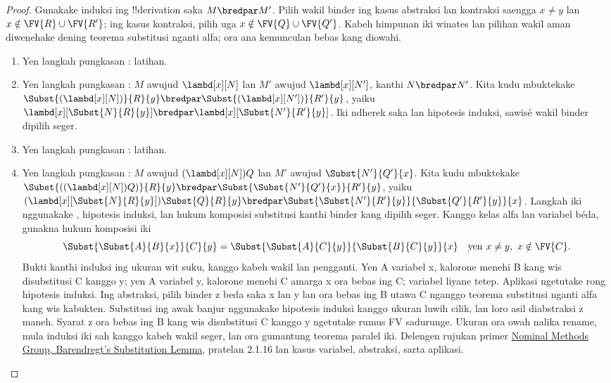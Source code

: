 \documentclass[../../../include/open-logic-section]{subfiles}
\begin{document}
\begin{proof}
  Gunakake induksi ing !!{derivation}
  saka $M \bredpar M'$. Pilih wakil binder ing kasus abstraksi lan kontraksi saengga $x\neq y$ lan $x\notin\FV{R}\cup\FV{R'}$; ing kasus kontraksi, pilih uga $x\notin\FV{Q}\cup\FV{Q'}$. Kabeh himpunan iki winates lan pilihan wakil aman diwenehake dening teorema substitusi nganti alfa; ora ana kemunculan bebas kang diowahi.
  \begin{enumerate}
    \item Yen langkah pungkasan
      : latihan.
    \item Yen langkah pungkasan
      : $M$
      awujud $\lambd[x][N]$ lan
      $M'$ awujud $\lambd[x][N']$,
      kanthi $N \bredpar N'$.
      Kita kudu mbuktekake
      $\Subst{(\lambd[x][N])}{R}{y} \bredpar
      \Subst{(\lambd[x][N'])}{R'}{y}$,
      yaiku
      $\lambd[x][\Subst{N}{R}{y}] \bredpar
      \lambd[x][\Subst{N'}{R'}{y}]$.
      Iki ndherek saka
       lan
      hipotesis induksi, sawisé
      wakil binder dipilih seger.
    \item Yen langkah pungkasan
      : latihan.
    \item Yen langkah pungkasan
      : $M$
      awujud $(\lambd[x][N])Q$
      lan $M'$ awujud
      $\Subst{N'}{Q'}{x}$.
      Kita kudu mbuktekake
      $\Subst{((\lambd[x][N])Q)}{R}{y} \bredpar
      \Subst{\Subst{N'}{Q'}{x}}{R'}{y}$,
      yaiku
      $(\lambd[x][\Subst{N}{R}{y}])\Subst{Q}{R}{y} \bredpar
      \Subst{\Subst{N'}{R'}{y}}{\Subst{Q'}{R'}{y}}{x}$.
      Langkah iki nggunakake
      ,
      hipotesis induksi, lan
      hukum komposisi substitusi kanthi binder kang dipilih seger. Kanggo kelas alfa lan variabel béda, gunakna hukum komposisi iki
      \[
       \Subst{\Subst{A}{B}{x}}{C}{y}
       =\Subst{\Subst{A}{C}{y}}{\Subst{B}{C}{y}}{x}
       \quad\text{yen }x\neq y,\ x\notin\FV{C}.
      \]
      Bukti kanthi induksi ing ukuran wit suku, kanggo kabeh wakil lan pengganti. Yen A variabel x, kalorone menehi B kang wis disubstitusi C kanggo y; yen A variabel y, kalorone menehi C amarga x ora bebas ing C; variabel liyane tetep. Aplikasi ngetutake rong hipotesis induksi. Ing abstraksi, pilih binder z beda saka x lan y lan ora bebas ing B utawa C nganggo teorema substitusi nganti alfa kang wis kabukten. Substitusi ing awak banjur nggunakake hipotesis induksi kanggo ukuran luwih cilik, lan loro asil diabstraksi z maneh. Syarat z ora bebas ing B kang wis disubstitusi C kanggo y ngetutake rumus FV sadurunge. Ukuran ora owah nalika rename, mula induksi iki sah kanggo kabeh wakil seger, lan ora gumantung teorema paralel iki. Delengen rujukan primer \href{https://isabelle.in.tum.de/nominal/example.html}{Nominal Methods Group, Barendregt's Substitution Lemma}, pratelan 2.1.16 lan kasus variabel, abstraksi, sarta aplikasi.

\end{enumerate}
\end{proof}
\end{document}

